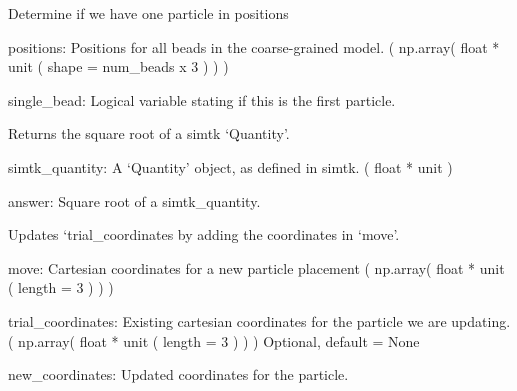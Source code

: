 \documentclass[letterpaper,10pt,english]{sphinxmanual}
\begin{document}

\begin{fulllineitems}
\label{\detokenize{index:utilities.util.single_bead}}
Determine if we have one particle in positions

positions: Positions for all beads in the coarse-grained model.
( np.array( float * unit ( shape = num\_beads x 3 ) ) )

single\_bead: Logical variable stating if this is the first particle.

\end{fulllineitems}


\begin{fulllineitems}
\label{\detokenize{index:utilities.util.unit_sqrt}}
Returns the square root of a simtk ‘Quantity’.

simtk\_quantity: A ‘Quantity’ object, as defined in simtk.
( float * unit )

answer: Square root of a simtk\_quantity.

\end{fulllineitems}


\begin{fulllineitems}
\label{\detokenize{index:utilities.util.update_trial_coordinates}}
Updates ‘trial\_coordinates by adding the coordinates in ‘move’.

move: Cartesian coordinates for a new particle placement
( np.array( float * unit ( length = 3 ) ) )

trial\_coordinates: Existing cartesian coordinates for the particle
we are updating.
( np.array( float * unit ( length = 3 ) ) )
Optional, default = None

new\_coordinates: Updated coordinates for the particle.

\end{fulllineitems}
\end{document}
